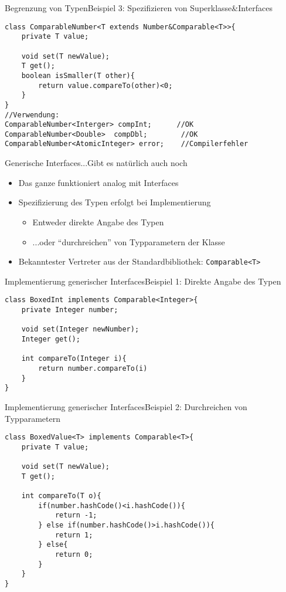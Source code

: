 \begin{frame}[fragile]{Begrenzung von Typen}{Beispiel 3: Spezifizieren von Superklasse\&Interfaces}
\lstset{style=javacode}
\begin{lstlisting}
class ComparableNumber<T extends Number&Comparable<T>>{
    private T value;
    
    void set(T newValue);
    T get();
    boolean isSmaller(T other){
        return value.compareTo(other)<0;
    }
}
//Verwendung:
ComparableNumber<Interger> compInt;      //OK
ComparableNumber<Double>  compDbl;        //OK
ComparableNumber<AtomicInteger> error;    //Compilerfehler
\end{lstlisting}
\end{frame}


\begin{frame}{Generische Interfaces}{...Gibt es natürlich auch noch}
    \begin{itemize}
        \item Das ganze funktioniert analog mit Interfaces
        \item Spezifizierung des Typen erfolgt bei Implementierung
        \begin{itemize}
            \item Entweder direkte Angabe des Typen
            \item ...oder "`durchreichen"' von Typparametern der Klasse
        \end{itemize}
        \item Bekanntester Vertreter aus der Standardbibliothek: \texttt{Comparable<T>}
    \end{itemize}
\end{frame}

\begin{frame}[fragile]{Implementierung generischer Interfaces}{Beispiel 1: Direkte Angabe des Typen}
\lstset{style=javacode}
\begin{lstlisting}
class BoxedInt implements Comparable<Integer>{
    private Integer number;
    
    void set(Integer newNumber);
    Integer get();
    
    int compareTo(Integer i){
        return number.compareTo(i)
    }
}
\end{lstlisting}
\end{frame}

\begin{frame}[fragile]{Implementierung generischer Interfaces}{Beispiel 2: Durchreichen von Typparametern}
\lstset{style=javacode}
\begin{lstlisting}
class BoxedValue<T> implements Comparable<T>{
    private T value;
    
    void set(T newValue);
    T get();
    
    int compareTo(T o){
        if(number.hashCode()<i.hashCode()){
            return -1;
        } else if(number.hashCode()>i.hashCode()){
            return 1;
        } else{
            return 0;
        }
    }
}
\end{lstlisting}
\end{frame}
